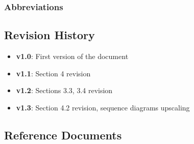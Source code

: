 \subsubsection{Abbreviations}


\subsection{Revision History}
\begin{itemize}
	\item \textbf{v1.0}: First version of the document
	\item \textbf{v1.1}: Section 4 revision
	\item \textbf{v1.2}: Sections 3.3, 3.4 revision
	\item \textbf{v1.3}: Section 4.2 revision, sequence diagrams upscaling
	
\end{itemize}


\subsection{Reference Documents}

